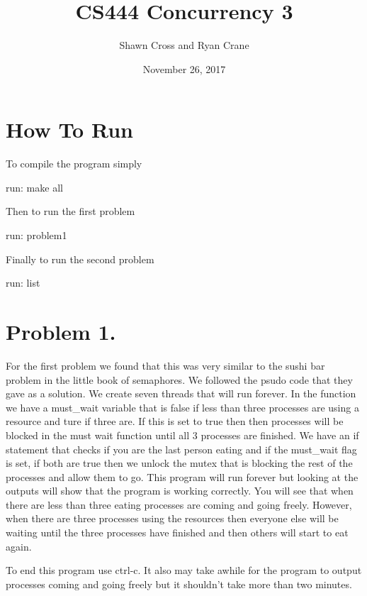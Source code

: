 \documentclass[letterpaper,10pt,titlepage]{article}
\begin{document}
\title{CS444 Concurrency 3}
\date{November 26, 2017}
\author{Shawn Cross and Ryan Crane}
\maketitle

\section{How To Run} To compile the program simply 

run: make all

Then to run the first problem 

run: problem1

Finally to run the second problem 

run: list

\section{Problem 1.} For the first problem we found that this was very similar 
to the sushi bar problem in the little book of semaphores. We followed the 
psudo code that they gave as a solution. We create seven threads that will 
run forever. In the function we have a must\_wait variable that is false if 
less than three processes are using a resource and ture if three are. If this is set to 
true then then processes will be blocked in the must wait function until all 3 processes 
are finished. We have an if statement that checks if you are the last person 
eating and if the must\_wait flag is set, if both are true then we unlock the 
mutex that is blocking the rest of the processes and allow them to go. This 
program will run forever but looking at the outputs will show that the 
program is working correctly. You will see that when there are less than 
three eating processes are coming and going freely. However, when there 
are three processes using the resources then everyone else will be waiting 
until the three processes have finished and then others will start to eat again.

To end this program use ctrl-c. It also may take awhile for the program to 
output processes coming and going freely but it shouldn't take more than 
two minutes.
\end{document}
